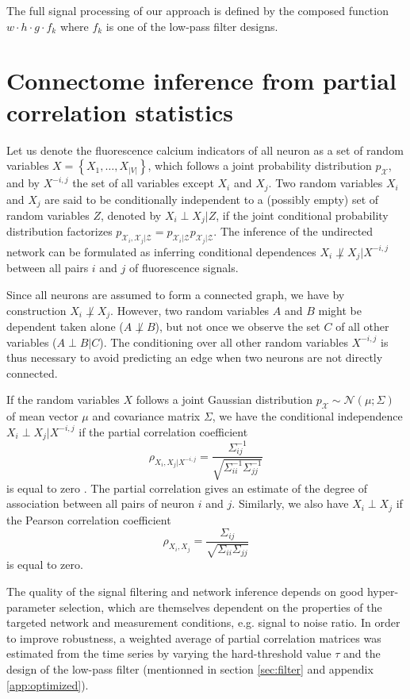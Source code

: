 \documentclass[wcp]{jmlr}
\begin{document}
The full signal processing of our approach is defined by the composed function
$
w \cdot h \cdot g \cdot f_k
$
where $f_k$ is one of the low-pass filter designs.

\section{Connectome inference from partial correlation statistics}
\label{sec:inference}

Let us denote the fluorescence calcium indicators of all neuron
as a set of random variables $X = \left\{X_1, \ldots, X_{|V|}\right\}$, which follows
a joint probability distribution $p_\mathcal{X}$, and by
$X^{-i,j}$ the set of all variables except $X_i$ and $X_j$.
Two random variables $X_i$ and $X_j$ are said to be conditionally independent
to a (possibly empty) set of random variables $Z$, denoted by $X_i \perp X_j | Z$,
if the joint conditional probability distribution factorizes
$p_{\mathcal{X}_i, \mathcal{X}_j|\mathcal{Z}} = p_{\mathcal{X}_i|\mathcal{Z}}
p_{\mathcal{X}_j|\mathcal{Z}}$.  The inference of the undirected network
can be formulated as inferring conditional dependences
$X_i \not\perp X_j | X^{-i,j}$ between all pairs $i$ and $j$ of fluorescence
signals.


Since all neurons are assumed to form a connected graph, we
have by construction $X_i \not\perp X_j$. However, two random variables $A$ and $B$ might be
dependent taken alone ($A \not\perp B$), but not once we observe the set  $C$
of all other variables ($A \perp B | C$). The conditioning over all other
random variables $X^{-i,j}$ is thus necessary to avoid predicting an edge when
two neurons are not directly connected.

If the random variables $X$ follows a joint Gaussian distribution
$p_\mathcal{X} \sim \mathcal{N}(\mu; \Sigma)$ of mean vector $\mu$ and
covariance matrix $\Sigma$, we have the conditional independence
$X_i \perp X_j | X^{-i,j}$ if the partial correlation coefficient
\[
\rho_{X_i, X_j | X^{-i,j}}
= \frac{\Sigma^{-1}_{ij}}{\sqrt{\Sigma^{-1}_{ii} \Sigma^{-1}_{jj}}}
\]
is equal to zero \citep{koller2009probabilistic}. The partial correlation gives
an estimate of the degree of association between all
pairs of neuron $i$ and $j$.
Similarly, we also have $X_i \perp X_j$ if the Pearson correlation
coefficient
\[
\rho_{X_i,X_j} = \frac{\Sigma_{ij}}{\sqrt{\Sigma_{ii}
\Sigma_{jj}}}
\]
is equal to zero.

The quality of the signal filtering and network inference depends on
good hyper-parameter selection, which are themselves dependent on the properties
of the targeted network and measurement conditions, e.g. signal to noise ratio.
In order to improve robustness, a weighted average of partial correlation
matrices was estimated from the time series by varying the hard-threshold value
$\tau$ and the design of the low-pass filter (mentionned in section \ref{sec:filter} and appendix \ref{app:optimized}).
\end{document}
